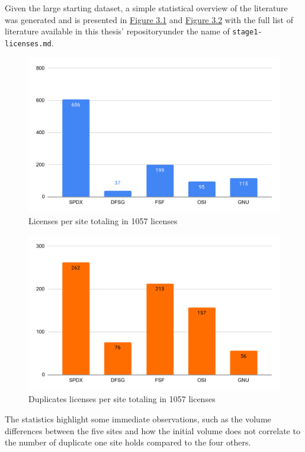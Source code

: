 Given the large starting dataset, a simple statistical overview of the literature was generated and is presented in \hyperref[fig:3-1]{Figure 3.1} and \hyperref[fig:3-2]{Figure 3.2} with the full list of literature available in this thesis' repository\footnotemark[1] under the name of \texttt{stage1-licenses.md}.
\begin{figure}
	\centering
	\includegraphics[scale=0.76]{figures/figure-3-1.pdf}
	\caption{Licenses per site totaling in 1057 licenses}
	\label{fig:3-1}
\end{figure}
\begin{figure}
	\centering
	\includegraphics[scale=0.76]{figures/figure-3-2.pdf}
	\caption{Duplicates licenses per site totaling in 1057 licenses}
	\label{fig:3-2}
\end{figure}
The statistics highlight some immediate observations, such as the volume differences between the five sites and how the initial volume does not correlate to the number of duplicate one site holds compared to the four others.

